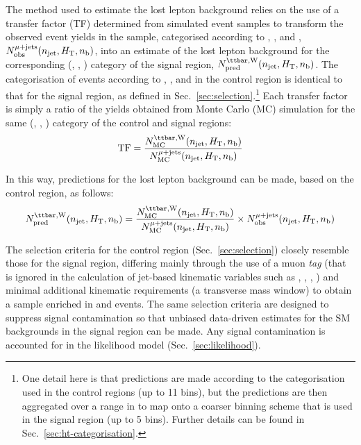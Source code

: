 The method used to estimate the lost lepton background relies on the
use of a transfer factor (TF) determined from simulated event samples
to transform the observed event yields in the \mj sample, categorised
according to \njet, \scalht, and \nb, $N_{\textrm{obs}}^{\mu + \textrm{jets}}(n_{\text{jet}}, \mbox{$H_\text{T}$},
n_{\text{b}})$, into an estimate of the lost lepton background for the
corresponding (\njet, \scalht, \nb) category of the signal region,
$\npre^{\ttw}(\njet, \scalht, \nb)$. The categorisation of events
according to \njet, \scalht, and \nb in the \mj control region is
identical to that for the signal region, as defined in
Sec.~\ref{sec:selection}.\footnote{One detail here is that predictions
  are made according to the \scalht categorisation used in the control
  regions (up to 11 bins), but the predictions are then aggregated
  over a range in \scalht to map onto a coarser binning scheme that is
  used in the signal region (up to 5 bins). Further details can be
  found in Sec.~\ref{sec:ht-categorisation}.}  Each transfer factor is
simply a ratio of the yields obtained from Monte Carlo (MC) simulation
for the same (\njet, \scalht, \nb) category of the \mj control and
signal regions:
\begin{equation}
  \label{equ:tf-ratio}
  {\rm TF} = \frac{N_{\rm MC}^{\ttw}(\njet, \scalht, \nb)}{N_{\rm MC}^{\mj}(\njet, \scalht, \nb)} 
\end{equation}

In this way, predictions for the lost lepton background can be made,
based on the \mj control region, as follows:
\begin{equation}
  \label{equ:pred-method}
  \npre^{\ttw}(\njet, \scalht, \nb) = 
  \frac{N_{\rm MC}^{\ttw}(\njet, \scalht, \nb)}{N_{\rm MC}^{\mj}(\njet, \scalht, \nb)} 
  \times 
  \nobs^{\mj}(\njet, \scalht, \nb)   
\end{equation}

The selection criteria for the \mj control region
(Sec.~\ref{sec:selection}) closely resemble those for the signal
region, differing mainly through the use of a muon {\it tag} (that is
ignored in the calculation of jet-based kinematic variables such as
\scalht, \mht, \alphat, \etc) and minimal additional kinematic
requirements (\eg a transverse mass window) to obtain a sample
enriched in \wj and \ttbar events. The same selection criteria are
designed to suppress signal contamination so that unbiased data-driven
estimates for the SM backgrounds in the signal region can be
made. Any signal contamination is accounted for in the likelihood
model (Sec.~\ref{sec:likelihood}). 

